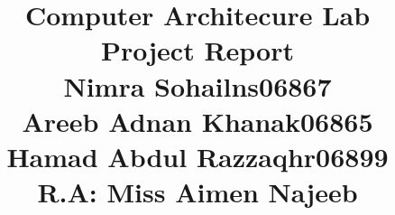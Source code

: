 \documentclass[12pt]{article}
\title{\textbf{Computer Architecure Lab}\\\textbf{Project Report}\\\vspace{30pt}Nimra Sohail\hspace{95pt}ns06867\\Areeb Adnan Khan\hspace{43pt}ak06865\\Hamad Abdul Razzaq\hspace{22pt}hr06899\\\vspace{30pt}\textbf{R.A: Miss Aimen Najeeb}}
\date{}
\begin{document}
\maketitle
\pagebreak
\end{document}
